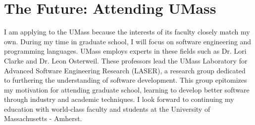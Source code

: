 \section*{The Future: Attending UMass}
I am applying to the UMass because the interests of its faculty closely match my own. During my time in graduate school, I will focus on software engineering and programming languages. UMass employs experts in these fields such as Dr. Lori Clarke and Dr. Leon Osterweil. These professors lead the UMass Laboratory for Advanced Software Engineering Research (LASER), a research group dedicated to furthering the understanding of software development. This group epitomizes my motivation for attending graduate school, learning to develop better software through industry and academic techniques. I look forward to continuing my education with world-class faculty and students at the University of Massachusetts - Amherst.